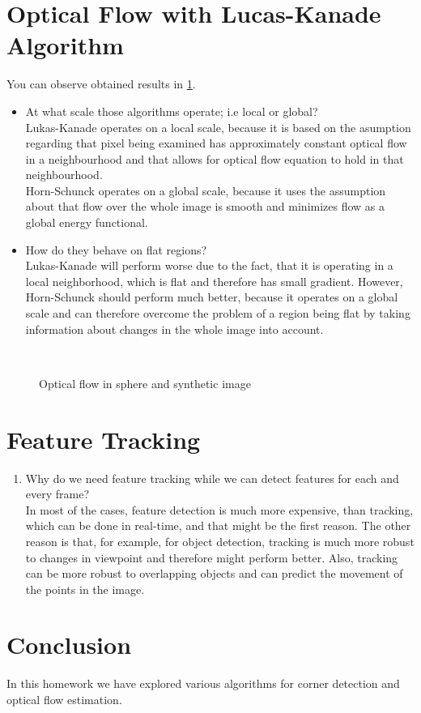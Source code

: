\documentclass{article}
\begin{document}
\section{Optical Flow with Lucas-Kanade Algorithm}
You can observe obtained results in \cref{fig:lucas}.

\begin{itemize}
    \item At what scale those algorithms operate; i.e local or global? \\
    Lukas-Kanade operates on a local scale, because it is based on the asumption regarding that pixel being examined has approximately constant optical flow in a neighbourhood and that allows for optical flow equation to hold in that neighbourhood.\\
    Horn-Schunck operates on a global scale, because it uses the assumption about that flow over the whole image is smooth and minimizes flow as a global energy functional.
    
    \item How do they behave on ﬂat regions?
    \\
    Lukas-Kanade will perform worse due to the fact, that it is operating in a local neighborhood, which is flat and therefore has small gradient. However, Horn-Schunck should perform much better, because it operates on a global scale and can therefore overcome the problem of a region being flat by taking information about changes in the whole image into account. 
    
\end{itemize}

\begin{figure}[h]
    \centering
\caption{Optical flow in sphere and synthetic image}
\\
\label{fig:lucas}
\end{figure}

\section{Feature Tracking}

\begin{enumerate}
    \item Why do we need feature tracking while we can detect features for each and every frame?\\
    In most of the cases, feature detection is much more expensive, than tracking, which can be done in real-time, and that might be the first reason. The other reason is that, for example, for object detection, tracking is much more robust to changes in viewpoint and therefore might perform better. Also, tracking can be more robust to overlapping objects and can predict the movement of the points in the image.
\end{enumerate}


\section*{Conclusion}

In this homework we have explored various algorithms for corner detection and optical flow estimation.
\end{document}
